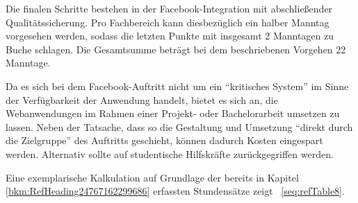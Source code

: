 \documentclass[a4paper]{article}
\begin{document}
\bigskip

{\sffamily
Die finalen Schritte bestehen in der Facebook-Integration mit abschließender Qualitätssicherung. Pro Fachbereich kann
diesbezüglich ein halber Manntag vorgesehen werden, sodass die letzten Punkte mit insgesamt 2 Manntagen zu Buche
schlagen. Die Gesamtsumme beträgt bei dem beschriebenen Vorgehen 22 Manntage.}


\bigskip

{\sffamily
Da es sich bei dem Facebook-Auftritt nicht um ein “kritisches System” im Sinne der Verfügbarkeit der Anwendung handelt,
bietet es sich an, die Webanwendungen im Rahmen einer Projekt- oder Bachelorarbeit umsetzen zu lassen. Neben der
Tatsache, dass so die Gestaltung und Umsetzung “direkt durch die Zielgruppe” des Auftritts geschieht, können dadurch
Kosten eingespart werden. Alternativ sollte auf studentische Hilfskräfte zurückgegriffen werden.}


\bigskip

{\sffamily
Eine exemplarische Kalkulation auf Grundlage der bereits in Kapitel \ref{bkm:RefHeading24767162299686} erfassten
Stundensätze zeigt \tablename~\ref{seq:refTable8}.}


\bigskip
\end{document}
